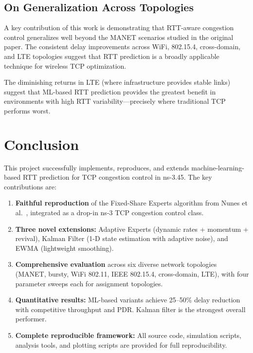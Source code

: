 \documentclass[12pt,a4paper]{article}
\begin{document}
\subsection{On Generalization Across Topologies}
A key contribution of this work is demonstrating that RTT-aware congestion control generalizes well beyond the MANET scenarios studied in the original paper. The consistent delay improvements across WiFi, 802.15.4, cross-domain, and LTE topologies suggest that RTT prediction is a broadly applicable technique for wireless TCP optimization.

The diminishing returns in LTE (where infrastructure provides stable links) suggest that ML-based RTT prediction provides the greatest benefit in environments with high RTT variability---precisely where traditional TCP performs worst.

\section{Conclusion}
\label{sec:conclusion}

This project successfully implements, reproduces, and extends machine-learning-based RTT prediction for TCP congestion control in ns-3.45. The key contributions are:

\begin{enumerate}
    \item \textbf{Faithful reproduction} of the Fixed-Share Experts algorithm from Nunes et al.~\cite{nunes2011}, integrated as a drop-in ns-3 TCP congestion control class.

    \item \textbf{Three novel extensions:} Adaptive Experts (dynamic rates + momentum + revival), Kalman Filter (1-D state estimation with adaptive noise), and EWMA (lightweight smoothing).

    \item \textbf{Comprehensive evaluation} across six diverse network topologies (MANET, bursty, WiFi 802.11, IEEE 802.15.4, cross-domain, LTE), with four parameter sweeps each for assignment topologies.

    \item \textbf{Quantitative results:} ML-based variants achieve 25--50\% delay reduction with competitive throughput and PDR. Kalman filter is the strongest overall performer.

    \item \textbf{Complete reproducible framework:} All source code, simulation scripts, analysis tools, and plotting scripts are provided for full reproducibility.
\end{enumerate}
\end{document}
